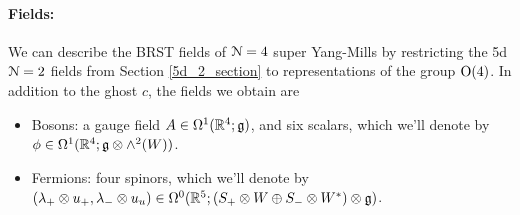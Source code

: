 \documentclass[10pt, oneside]{article}
\begin{document}
\vspace{-10pt}
\paragraph{Fields:} We can describe the BRST fields of $\mathcal{N}=4$ super Yang-Mills by restricting the 5d $\mathcal{N}=2$ fields from Section \ref{5d_2_section} to representations of the group $\mathrm{O}(4)$.  In addition to the ghost $c$, the fields we obtain are
\begin{itemize}
 \item Bosons: a gauge field $A \in \Omega^1(\mathbb R^4; \mathfrak{g})$, and six scalars, which we'll denote by $\phi \in \Omega^1(\mathbb R^4; \mathfrak{g} \otimes \wedge^2(W))$.
 \item Fermions: four spinors, which we'll denote by $(\lambda_+ \otimes u_+, \lambda_- \otimes u_u) \in \Omega^0(\mathbb R^5; (S_+ \otimes W \oplus S_- \otimes W^*) \otimes \mathfrak{g})$.
\end{itemize}

\vspace{-10pt}
\end{document}
